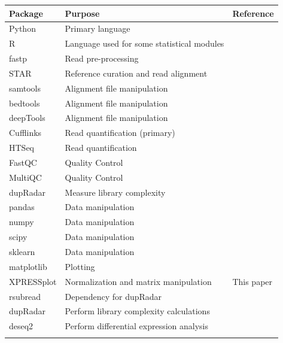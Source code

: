 \documentclass[11pt, a4paper, oneside]{article}
\begin{document}
\begin{tabular}{p{2.4cm}p{7.5cm}p{3cm}}
 \textbf{Package} & \textbf{Purpose} & \textbf{Reference} \\
 \hline
 Python & Primary language & \\
 \hline
 R & Language used for some statistical modules & \\
 \hline
 fastp & Read pre-processing & \cite{fastp} \\
 \hline
 STAR & Reference curation and read alignment & \cite{star} \\
 \hline
 samtools & Alignment file manipulation & \cite{samtools} \\
 \hline
 bedtools & Alignment file manipulation & \cite{bedtools} \\
 \hline
 deepTools & Alignment file manipulation & \cite{deeptools} \\
 \hline
 Cufflinks & Read quantification (primary) & \cite{cufflinks} \\
 \hline
 HTSeq & Read quantification & \cite{htseq} \\
 \hline
 FastQC & Quality Control & \cite{fastqc} \\
 \hline
 MultiQC & Quality Control & \cite{multiqc} \\
 \hline
 dupRadar & Measure library complexity & \cite{dupradar} \\
 \hline
 pandas & Data manipulation & \cite{pandas} \\
 \hline
 numpy & Data manipulation & \cite{numpy1, numpy2} \\
 \hline
 scipy & Data manipulation & \cite{scipy} \\
 \hline
 sklearn & Data manipulation & \cite{sklearn} \\
 \hline
 matplotlib & Plotting & \cite{matplotlib} \\
 \hline
 XPRESSplot & Normalization and matrix manipulation & This paper \\
 \hline
 rsubread & Dependency for dupRadar &  \\
 \hline
 dupRadar & Perform library complexity calculations & \cite{dupradar} \\
 \hline
 deseq2 & Perform differential expression analysis & \cite{deseq2} \\
 \label{Tab:software_pipe}
\end{tabular}
\newline
\end{document}

